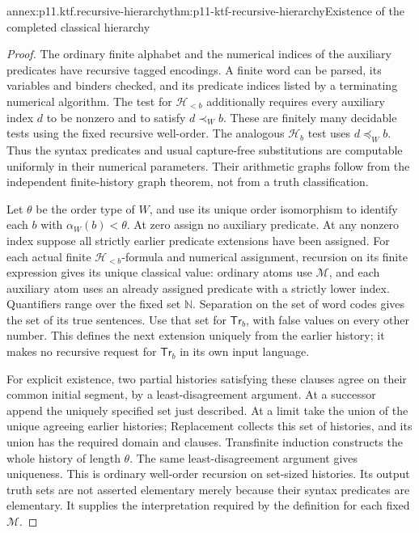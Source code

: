 \begin{annexitem}{annex:p11.ktf.recursive-hierarchy}{thm:p11-ktf-recursive-hierarchy}{Existence of the completed classical hierarchy}
\begin{proof}
The ordinary finite alphabet and the numerical indices of the auxiliary
predicates have recursive tagged encodings. A finite word can be parsed,
its variables and binders checked, and its predicate indices listed
by a terminating numerical algorithm. The test for
\(\mathcal H_{<b}\) additionally requires every auxiliary
index \(d\) to be nonzero and to satisfy \(d\prec_W b\).
These are finitely many decidable tests using the fixed recursive
well-order. The analogous \(\mathcal H_b\) test uses
\(d\preceq_W b\). Thus the syntax predicates and usual
capture-free substitutions are computable uniformly in their numerical
parameters. Their arithmetic graphs follow from the independent
finite-history graph theorem, not from a truth classification.

Let \(\theta\) be the order type of \(W\), and use its
unique order isomorphism to identify each \(b\) with
\(\alpha_W(b)<\theta\). At zero assign no auxiliary
predicate. At any nonzero index suppose all strictly earlier predicate
extensions have been assigned. For each actual finite
\(\mathcal H_{<b}\)-formula and numerical assignment, recursion
on its finite expression gives its unique classical value: ordinary
atoms use \(\mathcal M\), and each auxiliary atom uses an
already assigned predicate with a strictly lower index. Quantifiers
range over the fixed set \(\mathbb N\). Separation on the
set of word codes gives the set of its true sentences. Use that
set for \(\mathsf{Tr}_b\), with false values on every other
number. This defines the next extension uniquely from the earlier
history; it makes no recursive request for \(\mathsf{Tr}_b\)
in its own input language.

For explicit existence, two partial histories satisfying these clauses
agree on their common initial segment, by a least-disagreement argument.
At a successor append the uniquely specified set just described.
At a limit take the union of the unique agreeing earlier histories;
Replacement collects this set of histories, and its union has the
required domain and clauses. Transfinite induction constructs the
whole history of length \(\theta\). The same least-disagreement
argument gives uniqueness. This is ordinary well-order recursion
on set-sized histories. Its output truth sets are not asserted
elementary merely because their syntax predicates are elementary.
It supplies the interpretation required by the definition for each
fixed \(\mathcal M\).
\end{proof}
\end{annexitem}

